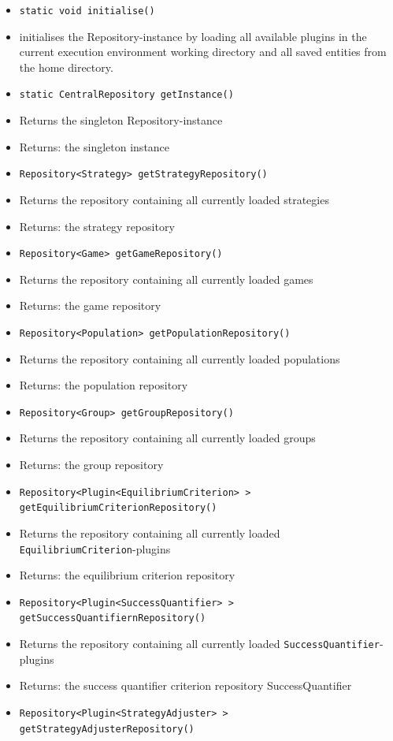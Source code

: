 \documentclass[parskip=full,11pt]{scrartcl}
\begin{document}
\begin{itemize} \itemsep -10pt
	\item \texttt{static void initialise()}
	\item[] initialises the Repository-instance by loading all available plugins in the current execution environment working directory and all saved entities from the home directory.
	\item \texttt{static CentralRepository getInstance()}
	\item[]Returns the singleton Repository-instance
	\item[] Returns: the singleton instance
	\item \texttt{Repository<Strategy> getStrategyRepository()}
	\item[]Returns the repository containing all currently loaded strategies
	\item[] Returns: the strategy repository
	\item \texttt{Repository<Game> getGameRepository()}
	\item[]Returns the repository containing all currently loaded games
	\item[] Returns: the game repository
	\item \texttt{Repository<Population> getPopulationRepository()}
	\item[]Returns the repository containing all currently loaded populations
	\item[] Returns: the population repository
	\item \texttt{Repository<Group> getGroupRepository()}
	\item[]Returns the repository containing all currently loaded groups
	\item[] Returns: the group repository
	\item \texttt{Repository<Plugin<EquilibriumCriterion>\,> getEquilibriumCriterionRepository()}
	\item[]Returns the repository containing all currently loaded \texttt{EquilibriumCriterion}-plugins
	\item[] Returns: the equilibrium criterion repository
	\item\texttt{Repository<Plugin<SuccessQuantifier>\,> getSuccessQuantifiernRepository()}
	\item[]Returns the repository containing all currently loaded \texttt{SuccessQuantifier}-plugins
	\item[] Returns: the success quantifier criterion repository
	SuccessQuantifier
	\item\texttt{Repository<Plugin<StrategyAdjuster>\,> getStrategyAdjusterRepository()}

\end{itemize}
\end{document}
